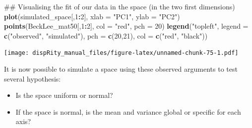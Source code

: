 \documentclass[]{book}
\newenvironment{Shaded}{\begin{snugshade}}{\end{snugshade}}
\newcommand{\KeywordTok}[1]{\textcolor[rgb]{0.13,0.29,0.53}{\textbf{#1}}}
\newcommand{\DataTypeTok}[1]{\textcolor[rgb]{0.13,0.29,0.53}{#1}}
\newcommand{\DecValTok}[1]{\textcolor[rgb]{0.00,0.00,0.81}{#1}}
\newcommand{\StringTok}[1]{\textcolor[rgb]{0.31,0.60,0.02}{#1}}
\newcommand{\OperatorTok}[1]{\textcolor[rgb]{0.81,0.36,0.00}{\textbf{#1}}}
\newcommand{\NormalTok}[1]{#1}
\providecommand{\tightlist}{%
  \setlength{\itemsep}{0pt}\setlength{\parskip}{0pt}}
\theoremstyle{definition}
\theoremstyle{definition}
\theoremstyle{remark}
\begin{document}
\begin{Shaded}
\begin{Highlighting}[]
\NormalTok{## Visualising the fit of our data in the space (in the two first dimensions)}
\KeywordTok{plot}\NormalTok{(simulated_space[,}\DecValTok{1}\OperatorTok{:}\DecValTok{2}\NormalTok{], }\DataTypeTok{xlab =} \StringTok{"PC1"}\NormalTok{, }\DataTypeTok{ylab =} \StringTok{"PC2"}\NormalTok{)}
\KeywordTok{points}\NormalTok{(BeckLee_mat50[,}\DecValTok{1}\OperatorTok{:}\DecValTok{2}\NormalTok{], }\DataTypeTok{col =} \StringTok{"red"}\NormalTok{, }\DataTypeTok{pch =} \DecValTok{20}\NormalTok{)}
\KeywordTok{legend}\NormalTok{(}\StringTok{"topleft"}\NormalTok{, }\DataTypeTok{legend =} \KeywordTok{c}\NormalTok{(}\StringTok{"observed"}\NormalTok{, }\StringTok{"simulated"}\NormalTok{),}
        \DataTypeTok{pch =} \KeywordTok{c}\NormalTok{(}\DecValTok{20}\NormalTok{,}\DecValTok{21}\NormalTok{), }\DataTypeTok{col =} \KeywordTok{c}\NormalTok{(}\StringTok{"red"}\NormalTok{, }\StringTok{"black"}\NormalTok{))}
\end{Highlighting}
\end{Shaded}

\texttt{[image: dispRity\_manual\_files/figure-latex/unnamed-chunk-75-1.pdf]}

It is now possible to simulate a space using these observed arguments to
test several hypothesis:

\begin{itemize}
\tightlist
\item
  Is the space uniform or normal?
\item
  If the space is normal, is the mean and variance global or specific
  for each axis?
\end{itemize}
\end{document}
